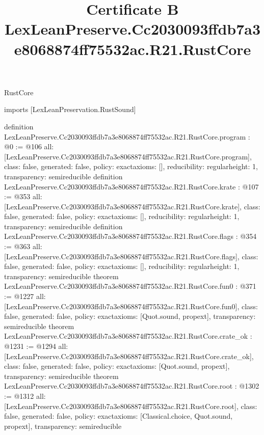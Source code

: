 \begin{lexlean}{RustCore}
\title{Certificate B LexLeanPreserve.Cc2030093ffdb7a3e8068874ff75532ac.R21.RustCore}
\begin{coremodule}
imports [LexLeanPreservation.RustSound]

definition LexLeanPreserve.Cc2030093ffdb7a3e8068874ff75532ac.R21.RustCore.program : @0 := @106 {
  all: [LexLeanPreserve.Cc2030093ffdb7a3e8068874ff75532ac.R21.RustCore.program],
  class: false,
  generated: false,
  policy: exact{axioms: []},
  reducibility: regular{height: 1},
  transparency: semireducible
}
definition LexLeanPreserve.Cc2030093ffdb7a3e8068874ff75532ac.R21.RustCore.krate : @107 := @353 {
  all: [LexLeanPreserve.Cc2030093ffdb7a3e8068874ff75532ac.R21.RustCore.krate],
  class: false,
  generated: false,
  policy: exact{axioms: []},
  reducibility: regular{height: 1},
  transparency: semireducible
}
definition LexLeanPreserve.Cc2030093ffdb7a3e8068874ff75532ac.R21.RustCore.flags : @354 := @363 {
  all: [LexLeanPreserve.Cc2030093ffdb7a3e8068874ff75532ac.R21.RustCore.flags],
  class: false,
  generated: false,
  policy: exact{axioms: []},
  reducibility: regular{height: 1},
  transparency: semireducible
}
theorem LexLeanPreserve.Cc2030093ffdb7a3e8068874ff75532ac.R21.RustCore.fun0 : @371 := @1227 {
  all: [LexLeanPreserve.Cc2030093ffdb7a3e8068874ff75532ac.R21.RustCore.fun0],
  class: false,
  generated: false,
  policy: exact{axioms: [Quot.sound, propext]},
  transparency: semireducible
}
theorem LexLeanPreserve.Cc2030093ffdb7a3e8068874ff75532ac.R21.RustCore.crate_ok : @1231 := @1294 {
  all: [LexLeanPreserve.Cc2030093ffdb7a3e8068874ff75532ac.R21.RustCore.crate_ok],
  class: false,
  generated: false,
  policy: exact{axioms: [Quot.sound, propext]},
  transparency: semireducible
}
theorem LexLeanPreserve.Cc2030093ffdb7a3e8068874ff75532ac.R21.RustCore.root : @1302 := @1312 {
  all: [LexLeanPreserve.Cc2030093ffdb7a3e8068874ff75532ac.R21.RustCore.root],
  class: false,
  generated: false,
  policy: exact{axioms: [Classical.choice, Quot.sound, propext]},
  transparency: semireducible
}


\end{coremodule}
\end{lexlean}
